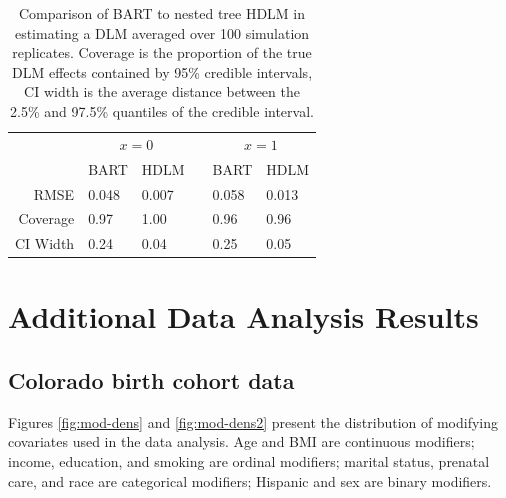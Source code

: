 \documentclass[12pt]{article}
\begin{document}

\begin{table}[!ht]
    \caption{Comparison of BART to nested tree HDLM in estimating a DLM averaged over 100 simulation replicates. Coverage is the proportion of the true DLM effects contained by 95\% credible intervals, CI width is the average distance between the 2.5\% and 97.5\% quantiles of the credible interval.}
    \label{tab:tdlm_v_bart}
    \centering
    \begin{tabular}{rllcll}
    \toprule[2pt]
            & \multicolumn{2}{c}{$x=0$} && \multicolumn{2}{c}{$x=1$}\\
            & BART & HDLM && BART & HDLM \\
            \cmidrule{2-3}\cmidrule{5-6}
         RMSE & 0.048&0.007&&0.058&0.013\\
         Coverage & 0.97&1.00&&0.96&0.96\\
         CI Width & 0.24&0.04&&0.25&0.05\\
         \bottomrule[2pt]
    \end{tabular}
\end{table}






\clearpage
\section{Additional Data Analysis Results} 
\subsection{Colorado birth cohort data}
Figures \ref{fig:mod-dens} and \ref{fig:mod-dens2} present the distribution of modifying covariates used in the data analysis. Age and BMI are continuous modifiers; income, education, and smoking are ordinal modifiers; marital status, prenatal care, and race are categorical modifiers; Hispanic and sex are binary modifiers.
\end{document}
